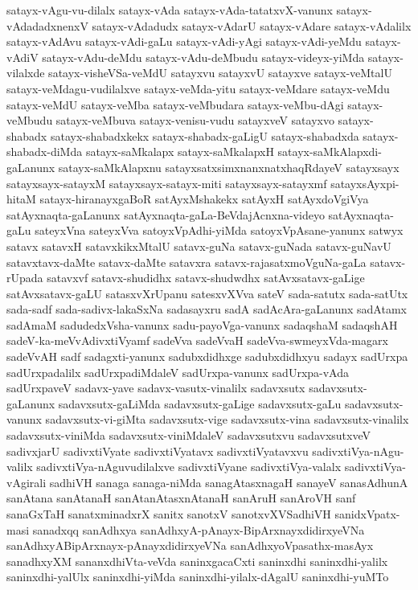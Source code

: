 {satayx-vAgu-vu-dilalx
satayx-vAda
satayx-vAda-tatatxvX-vanunx
satayx-vAdadadxnenxV
satayx-vAdadudx
satayx-vAdarU
satayx-vAdare
satayx-vAdalilx
satayx-vAdAvu
satayx-vAdi-gaLu
satayx-vAdi-yAgi
satayx-vAdi-yeMdu
satayx-vAdiV
satayx-vAdu-deMdu
satayx-vAdu-deMbudu
satayx-videyx-yiMda
satayx-vilalxde
satayx-visheVSa-veMdU
satayxvu
satayxvU
satayxve
satayx-veMtalU
satayx-veMdagu-vudilalxve
satayx-veMda-yitu
satayx-veMdare
satayx-veMdu
satayx-veMdU
satayx-veMba
satayx-veMbudara
satayx-veMbu-dAgi
satayx-veMbudu
satayx-veMbuva
satayx-venisu-vudu
satayxveV
satayxvo
satayx-shabadx
satayx-shabadxkekx
satayx-shabadx-gaLigU
satayx-shabadxda
satayx-shabadx-diMda
satayx-saMkalapx
satayx-saMkalapxH
satayx-saMkAlapxdi-gaLanunx
satayx-saMkAlapxnu
satayxsatxsimxnanxnatxhaqRdayeV
satayxsayx
satayxsayx-satayxM
satayxsayx-satayx-miti
satayxsayx-satayxmf
satayxsAyxpi-hitaM
satayx-hiranayxgaBoR
satAyxMshakekx
satAyxH
satAyxdoVgiVya
satAyxnaqta-gaLanunx
satAyxnaqta-gaLa-BeVdajAcnxna-videyo
satAyxnaqta-gaLu
sateyxVna
sateyxVva
satoyxVpAdhi-yiMda
satoyxVpAsane-yanunx
satwyx
satavx
satavxH
satavxkikxMtalU
satavx-guNa
satavx-guNada
satavx-guNavU
satavxtavx-daMte
satavx-daMte
satavxra
satavx-rajasatxmoVguNa-gaLa
satavx-rUpada
satavxvf
satavx-shudidhx
satavx-shudwdhx
satAvxsatavx-gaLige
satAvxsatavx-gaLU
satasxvXrUpanu
satesxvXVva
sateV
sada-satutx
sada-satUtx
sada-sadf
sada-sadivx-lakaSxNa
sadasayxru
sadA
sadAcAra-gaLanunx
sadAtamx
sadAmaM
sadudedxVsha-vanunx
sadu-payoVga-vanunx
sadaqshaM
sadaqshAH
sadeV-ka-meVvAdivxtiVyamf
sadeVva
sadeVvaH
sadeVva-swmeyxVda-magarx
sadeVvAH
sadf
sadagxti-yanunx
sadubxdidhxge
sadubxdidhxyu
sadayx
sadUrxpa
sadUrxpadalilx
sadUrxpadiMdaleV
sadUrxpa-vanunx
sadUrxpa-vAda
sadUrxpaveV
sadavx-yave
sadavx-vasutx-vinalilx
sadavxsutx
sadavxsutx-gaLanunx
sadavxsutx-gaLiMda
sadavxsutx-gaLige
sadavxsutx-gaLu
sadavxsutx-vanunx
sadavxsutx-vi-giMta
sadavxsutx-vige
sadavxsutx-vina
sadavxsutx-vinalilx
sadavxsutx-viniMda
sadavxsutx-viniMdaleV
sadavxsutxvu
sadavxsutxveV
sadivxjarU
sadivxtiVyate
sadivxtiVyatavx
sadivxtiVyatavxvu
sadivxtiVya-nAgu-valilx
sadivxtiVya-nAguvudilalxve
sadivxtiVyane
sadivxtiVya-valalx
sadivxtiVya-vAgirali
sadhiVH
sanaga
sanaga-niMda
sanagAtasxnagaH
sanayeV
sanasAdhunA
sanAtana
sanAtanaH
sanAtanAtasxnAtanaH
sanAruH
sanAroVH
sanf
sanaGxTaH
sanatxminadxrX
sanitx
sanotxV
sanotxvXVSadhiVH
sanidxVpatx-masi
sanadxqq
sanAdhxya
sanAdhxyA-pAnayx-BipArxnayxdidirxyeVNa
sanAdhxyABipArxnayx-pAnayxdidirxyeVNa
sanAdhxyoVpasathx-masAyx
sanadhxyXM
sananxdhiVta-veVda
saninxgacaCxti
saninxdhi
saninxdhi-yalilx
saninxdhi-yalUlx
saninxdhi-yiMda
saninxdhi-yilalx-dAgalU
saninxdhi-yuMTo
}
